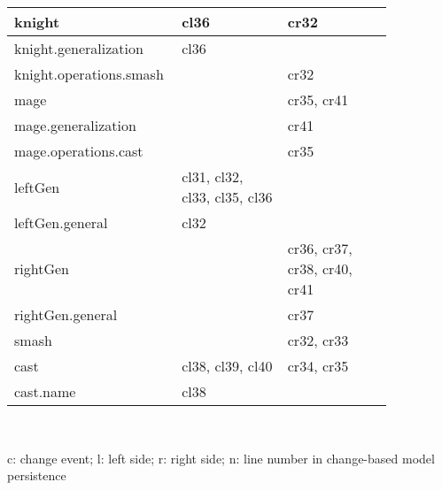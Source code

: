 \begin{table*}[ht]
\begin{scriptsize}
\begin{sffamily}
\begin{tabular}{|m{0.30\linewidth}|m{0.275\linewidth}|m{0.275\linewidth}|}
knight                             & cl36                                      & cr32                                       \\ \hline
knight.generalization              & cl36                                      &                                            \\ \hline
knight.operations.smash            &                                           & cr32                                       \\ \hline
mage                               &                                           & cr35, cr41                                 \\ \hline
mage.generalization                &                                           & cr41                                       \\ \hline
mage.operations.cast               &                                           & cr35                                       \\ \hline
leftGen                            & cl31, cl32, cl33, cl35, cl36              &                                            \\ \hline
leftGen.general                    & cl32                                      &                                            \\ \hline
rightGen                           &                                           & cr36, cr37, cr38, cr40, cr41               \\ \hline
rightGen.general                   &                                           & cr37                                       \\ \hline
smash                              &                                           & cr32, cr33                                 \\ \hline
cast                               & cl38, cl39, cl40                          & cr34, cr35                                 \\ \hline
cast.name                          & cl38                                      &                                            \\ \hline
\end{tabular}\\
\end{sffamily}
c: change event; l: left side; r: right side; n: line number in change-based model persistence
  \end{scriptsize}
\end{table*}



